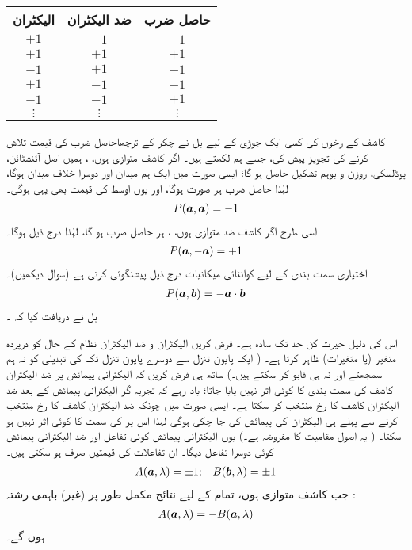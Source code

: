 \begin{center}
\begin{tabular}{c c c}
\toprule
الیکٹران & ضد الیکٹران &حاصل  ضرب \\
\midrule
$+1$ & $-1$ & $-1$ \\
$+1$ & $+1$ & $+1$ \\
$-1$ & $+1$ & $-1$ \\
$+1$ & $-1$ & $-1$ \\
$-1$ & $-1$ & $+1$ \\
$\vdots$ & $\vdots$ & $\vdots$ \\
\bottomrule
\end{tabular}
\end{center}

کاشف کے رخوں کی کسی ایک جوڑی کے لیے بل نے چکر کے  ترچھا{حاصل ضرب}  کی   قیمت تلاش  کرنے کی تجویز پیش کی،  جسے ہم  لکھتے ہیں۔ اگر کاشف متوازی ہوں،  ،  ہمیں   اصل آئنشٹائن،    پوڈلسکی،  روزن و  بوہم تشکیل  حاصل ہو گا؛  ایسی صورت میں ایک ہم میدان اور دوسرا خلاف میدان ہوگا،  لہٰذا  حاصل ضرب ہر صورت  ہوگا،  اور یوں اوسط کی قیمت بھی یہی ہوگی۔
\begin{align}
	P({{\boldsymbol{a}}},{{\boldsymbol{a}}}) = -1
\end{align}
اسی طرح اگر کاشف ضد متوازی ہوں، ،  ہر حاصل ضرب  ہو گا، لہٰذا درج ذیل ہوگا۔
\begin{align}
	P({{\boldsymbol{a}}}, -{{\boldsymbol{a}}}) = +1
\end{align}
اختیاری سمت بندی کے لیے کوانٹائی  میکانیات درج ذیل پیشنگوئی  کرتی ہے (سوال   دیکھیں)۔
\begin{align}\label{مساوات_پس_پیشنگوئی}
	P({{\boldsymbol{a}}}, {{\boldsymbol{b}}}) = -{{\boldsymbol{a}}}\cdot {\ensuremath{{\boldsymbol{b}}}}
\end{align}
 بل نے دریافت کیا کہ ۔

اس کی دلیل حیرت کن حد تک سادہ ہے۔ فرض کریں الیکٹران و  ضد الیکٹران نظام کے  حال کو  درپردہ متغیر (یا متغیرات)    ظاہر کرتا ہے۔ ( ایک پایون تنزل سے دوسرے پایون تنزل تک  کی تبدیلی کو نہ ہم سمجھتے اور نہ ہی قابو کر سکتے ہیں۔)  ساتھ ہی فرض کریں  کہ الیکٹرانی  پیمائش پر ضد الیکٹران کاشف کی سمت بندی  کا کوئی اثر نہیں پایا جاتا؛  یاد رہے کہ تجربہ گر  الیکٹرانی پیمائش کے بعد ضد الیکٹران کاشف کا رخ منتخب کر سکتا ہے۔ ایسی صورت میں چونکہ ضد الیکٹران کاشف کا رخ منتخب کرنے سے پہلے ہی الیکٹران کی پیمائش کی جا چکی ہوگی لہٰذا اس پر   کی  سمت کا کوئی اثر نہیں ہو سکتا۔ ( یہ اصول مقامیت کا مفروضہ ہے۔)  یوں الیکٹرانی پیمائش کوئی تفاعل  اور ضد الیکٹرانی پیمائش کوئی  دوسرا تفاعل  دیگا۔ ان تفاعلات کی قیمتیں صرف  ہو سکتی ہیں۔
\begin{align}\label{مساوات_پس_دو_رشتے}
	A({{\boldsymbol{a}}}, \lambda) = \pm1; && B({{\boldsymbol{b}}}, \lambda) = \pm 1
\end{align}
جب کاشف متوازی ہوں، تمام  کے لیے  نتائج مکمل طور پر (غیر)  باہمی رشتہ :
\begin{align}\label{مساوات_پس_غیر_باہمی_رشتہ}
	A({{\boldsymbol{a}}}, \lambda) = -B({{\boldsymbol{a}}}, \lambda)
\end{align}
ہوں گے۔

